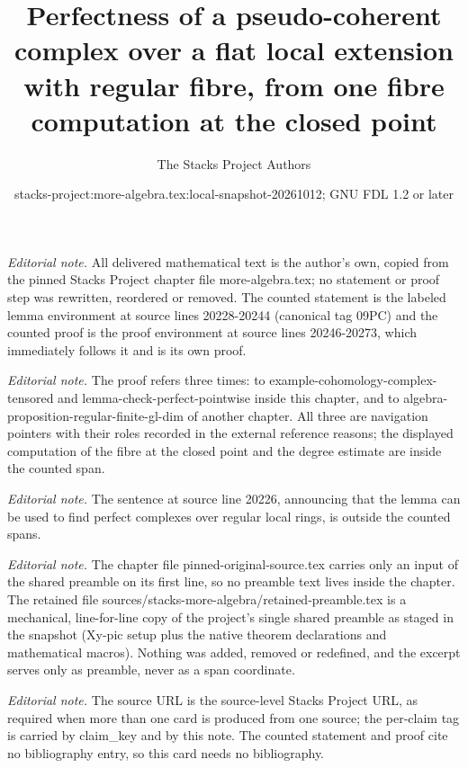 \documentclass[10pt,a4paper]{amsart}
\title{Perfectness of a pseudo-coherent complex over a flat local extension with regular fibre, from one fibre computation at the closed point}
\author{The Stacks Project Authors}
\date{stacks-project:more-algebra.tex:local-snapshot-20261012; GNU FDL 1.2 or later}
\theoremstyle{plain}
\theoremstyle{definition}
\theoremstyle{remark}
\numberwithin{equation}{subsection}
\begin{document}
\maketitle
\setcounter{subsection}{1}
\noindent\textit{Editorial note.} All delivered mathematical text is the author's own, copied from the pinned Stacks Project chapter file more-algebra.tex; no statement or proof step was rewritten, reordered or removed. The counted statement is the labeled lemma environment at source lines 20228-20244 (canonical tag 09PC) and the counted proof is the proof environment at source lines 20246-20273, which immediately follows it and is its own proof.\par\medskip
\noindent\textit{Editorial note.} The proof refers three times: to example-cohomology-complex-tensored and lemma-check-perfect-pointwise inside this chapter, and to algebra-proposition-regular-finite-gl-dim of another chapter. All three are navigation pointers with their roles recorded in the external reference reasons; the displayed computation of the fibre at the closed point and the degree estimate are inside the counted span.\par\medskip
\noindent\textit{Editorial note.} The sentence at source line 20226, announcing that the lemma can be used to find perfect complexes over regular local rings, is outside the counted spans.\par\medskip
\noindent\textit{Editorial note.} The chapter file pinned-original-source.tex carries only an input of the shared preamble on its first line, so no preamble text lives inside the chapter. The retained file sources/stacks-more-algebra/retained-preamble.tex is a mechanical, line-for-line copy of the project's single shared preamble as staged in the snapshot (Xy-pic setup plus the native theorem declarations and mathematical macros). Nothing was added, removed or redefined, and the excerpt serves only as preamble, never as a span coordinate.\par\medskip
\noindent\textit{Editorial note.} The source URL is the source-level Stacks Project URL, as required when more than one card is produced from one source; the per-claim tag is carried by claim\_key and by this note. The counted statement and proof cite no bibliography entry, so this card needs no bibliography.\par\medskip
\end{document}
